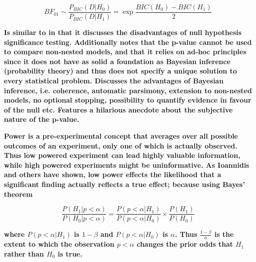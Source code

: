 \documentclass[12pt]{scrartcl}
\begin{document}
\begin{description}
  \begin{equation*}
    BF_{01} \sim \frac{P_{BIC}(D|H_0)}{P_{BIC}(D|H_1)} = \exp{\frac{BIC(H_0) - BIC(H_1)}{2}}
  \end{equation*}
  
  \item {}
  
  \textbf{Is similar to \cite{wagenmakers2007practical} in that it discusses the disadvantages of null hypothesis significance testing. Additionally notes that the p-value cannot be used to compare non-nested models, and that it relies on ad-hoc principles since it does not have as solid a foundation as Bayesian inference (probability theory) and thus does not specify a unique solution to every statistical problem. Discusses the advantages of Bayesian inference, i.e. coherence, automatic parsimony, extension to non-nested models, no optional stopping, possibility to quantify evidence in favour of the null etc. Features a hilarious anecdote about the subjective nature of the p-value.}
  
  \item {}
  
  \item {}
  
  \item {}
  
  \item {}
  
  \item {}
  
  \textbf{Power is a pre-experimental concept that averages over all possible outcomes of an experiment, only one of which is actually observed. Thus low powered experiment can lead highly valuable information, while high powered experiments might be uninformative. As Ioannidis \cite{ioannidis2005most} and others \cite{button2013power} have shown, low power effects the likelihood that a significant finding actually reflects a true effect; because using Bayes' theorem}
  
  \begin{equation*}
    \frac{P(H_1 | p < \alpha)}{P(H_0 | p < \alpha)} = \frac{P(p < \alpha | H_1)}{P(p < \alpha | H_0)} \times \frac{P(H_1)}{P(H_0)}
  \end{equation*}
  
  \textbf{where $P(p < \alpha | H_1)$ is $1 - \beta$ and $P(p < \alpha | H_0)$ is $\alpha$. Thus $\frac{1 - \beta}{\alpha}$ is the extent to which the observation $p < \alpha$ changes the prior odds that $H_1$ rather than $H_0$ is true.}
  

\end{description}
\end{document}
